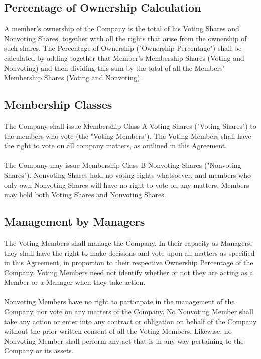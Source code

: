 \documentclass[11pt]{article}
\begin{document}
\subsection{Percentage of Ownership Calculation}
A member's ownership of the Company is the total of his Voting Shares and Nonvoting Shares, together with all the rights that arise from the ownership of such shares. The Percentage of Ownership ("Ownership Percentage") shall be calculated by adding together that Member's Membership Shares (Voting and Nonvoting) and then dividing this sum by the total of all the Members' Membership Shares (Voting and Nonvoting).

\subsection{Membership Classes}
\label{sec:membershipClasses}
The Company shall issue Membership Class A Voting Shares ("Voting Shares") to the members who vote (the "Voting Members"). The Voting Members shall have the right to vote on all company matters, as outlined in this Agreement.\\\\
The Company may issue Membership Class B Nonvoting Shares ("Nonvoting Shares"). Nonvoting Shares hold no voting rights whatsoever, and members who only own Nonvoting Shares will have no right to vote on any matters. Members may hold both Voting Shares and Nonvoting Shares.

\subsection{Management by Managers}
The Voting Members shall manage the Company. In their capacity as Managers, they shall have the right to make decisions and vote upon all matters as specified in this Agreement, in proportion to their respective Ownership Percentage of the Company. Voting Members need not identify whether or not they are acting as a Member or a Manager when they take action.\\\\
Nonvoting Members have no right to participate in the management of the Company, nor vote on any matters of the Company. No Nonvoting Member shall take any action or enter into any contract or obligation on behalf of the Company without the prior written consent of all the Voting Members. Likewise, no Nonvoting Member shall perform any act that is in any way pertaining to the Company or its assets.
\end{document}
